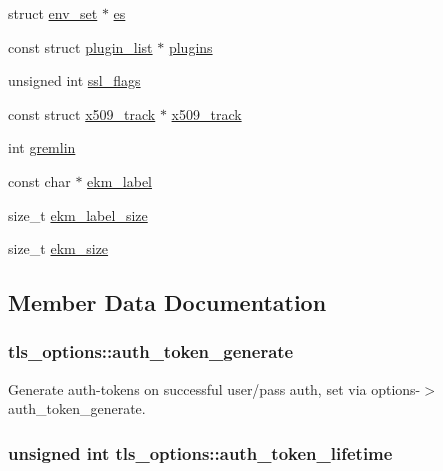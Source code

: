 \begin{DoxyCompactItemize}
\item 
struct \hyperlink{structenv__set}{env\+\_\+set} $\ast$ \hyperlink{structtls__options_a29e88c10288d7ee1207ed626117a4ea4}{es}
\item 
const struct \hyperlink{structplugin__list}{plugin\+\_\+list} $\ast$ \hyperlink{structtls__options_a65cc3bb31f01ba455cf02d05d9278990}{plugins}
\item 
unsigned int \hyperlink{structtls__options_ac316f151e832d8d58f7e4601a56d8ec2}{ssl\+\_\+flags}
\item 
const struct \hyperlink{structx509__track}{x509\+\_\+track} $\ast$ \hyperlink{structtls__options_aa89186ad01664f682492681829e7fffa}{x509\+\_\+track}
\item 
int \hyperlink{structtls__options_a2e82573d07cb52d69a675b425a2289b0}{gremlin}
\item 
const char $\ast$ \hyperlink{structtls__options_a82f79817c7b40b932af6074ab2ae6248}{ekm\+\_\+label}
\item 
size\+\_\+t \hyperlink{structtls__options_a37f7ed366f2247399784d478243d2ce1}{ekm\+\_\+label\+\_\+size}
\item 
size\+\_\+t \hyperlink{structtls__options_a85a0b7f779720f69cbb54dc8c66a1f28}{ekm\+\_\+size}
\end{DoxyCompactItemize}


\subsection{Member Data Documentation}
\hypertarget{structtls__options_ac372c2391af017e204af37a3e80596b4}{}
\subsubsection[{auth\+\_\+token\+\_\+generate}]{ tls\+\_\+options\+::auth\+\_\+token\+\_\+generate}\label{structtls__options_ac372c2391af017e204af37a3e80596b4}
Generate auth-\/tokens on successful user/pass auth, set via options-\/$>$auth\+\_\+token\+\_\+generate. \hypertarget{structtls__options_a29eb252102c01147ec581ed6195ef810}{}
\subsubsection[{auth\+\_\+token\+\_\+lifetime}]{\setlength{\rightskip}{0pt plus 5cm}unsigned int tls\+\_\+options\+::auth\+\_\+token\+\_\+lifetime}\label{structtls__options_a29eb252102c01147ec581ed6195ef810}
\hypertarget{structtls__options_a40a53a0bdb1e513c6c72f86b5d4d0878}{}
